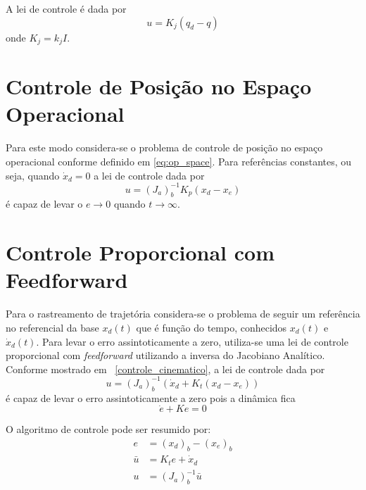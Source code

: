 A lei de controle é dada por 
\begin{equation}
{u} = {K}_j ({q}_d - {q})
\end{equation}
onde ${K_j} = k_j {I}$.

\section{Controle de Posição no Espaço Operacional} \label{sec:pos_operacional}
Para este modo considera-se o problema de controle de posição no espaço operacional conforme definido em \ref{eq:op_space}. Para referências constantes, ou seja, quando $\dot{{x}}_d = 0$ a lei de controle dada por
\begin{equation} \label{eq:lei_posicao}
{u} = ({J}_{a})_b^{-1} {K}_p ({x_d} - {x_e})
\end{equation}
é capaz de levar o ${e} \rightarrow 0$ quando $t \rightarrow \infty$.

\section{Controle Proporcional com Feedforward} \label{sec:pplusf}
Para o rastreamento de trajetória considera-se o problema de seguir um referência no referencial da base ${x}_d(t)$ que é função do tempo, conhecidos ${x}_d(t)$ e ${\dot{x}}_d(t)$. Para levar o erro assintoticamente a zero, utiliza-se uma lei de controle proporcional com \textit{feedforward} utilizando a inversa do Jacobiano Analítico. Conforme mostrado em ~\ref{controle_cinematico}, a lei de controle dada por 
\begin{equation}
{u} = ({J}_{a})_b^{-1} (\dot{{x}}_d + {K}_t ({x_d} - {x_e}))
\end{equation} 
é capaz de levar o erro assintoticamente a zero pois a dinâmica fica 
\begin{equation}
\dot{{e}} + {K} {e} = 0
\end{equation}

O algoritmo de controle pode ser resumido por:
\begin{align}
{e} &= ({x}_d)_b- ({x_e})_b  \label{eq:error_pf}\\
{\bar{u}} &= {K}_t {e} + {\dot{x}}_d \\
{u} &= ({J}_a)_b^{-1} {\bar{u}}
\end{align}



